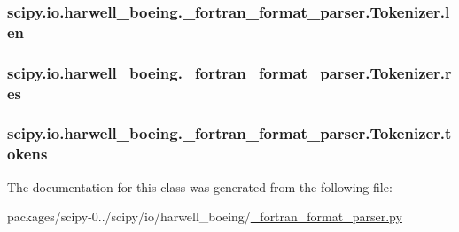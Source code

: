 \subsubsection[{len}]{\setlength{\rightskip}{0pt plus 5cm}scipy.\+io.\+harwell\+\_\+boeing.\+\_\+fortran\+\_\+format\+\_\+parser.\+Tokenizer.\+len}\label{classscipy_1_1io_1_1harwell__boeing_1_1__fortran__format__parser_1_1Tokenizer_a12d8efc7264f20db599ee228881fafef}
\hypertarget{classscipy_1_1io_1_1harwell__boeing_1_1__fortran__format__parser_1_1Tokenizer_ad47efe51ccffadd73707937956715e37}{}
\subsubsection[{res}]{\setlength{\rightskip}{0pt plus 5cm}scipy.\+io.\+harwell\+\_\+boeing.\+\_\+fortran\+\_\+format\+\_\+parser.\+Tokenizer.\+res}\label{classscipy_1_1io_1_1harwell__boeing_1_1__fortran__format__parser_1_1Tokenizer_ad47efe51ccffadd73707937956715e37}
\hypertarget{classscipy_1_1io_1_1harwell__boeing_1_1__fortran__format__parser_1_1Tokenizer_a2b4cf269cbced4a471eab3fc17fd9017}{}
\subsubsection[{tokens}]{\setlength{\rightskip}{0pt plus 5cm}scipy.\+io.\+harwell\+\_\+boeing.\+\_\+fortran\+\_\+format\+\_\+parser.\+Tokenizer.\+tokens}\label{classscipy_1_1io_1_1harwell__boeing_1_1__fortran__format__parser_1_1Tokenizer_a2b4cf269cbced4a471eab3fc17fd9017}


The documentation for this class was generated from the following file\+:\begin{DoxyCompactItemize}
\item 
packages/scipy-\/0../scipy/io/harwell\+\_\+boeing/\hyperlink{__fortran__format__parser_8py}{\+\_\+fortran\+\_\+format\+\_\+parser.\+py}\end{DoxyCompactItemize}
